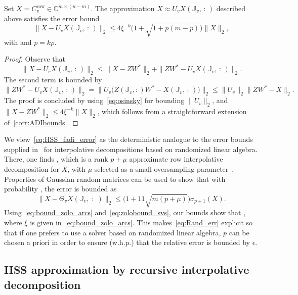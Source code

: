 \documentclass[final,reqno,onefignum,onetabnum]{siamart190516}
\newcommand{\C}{\mathbb{C}}
\begin{document}
\begin{lemma} 
\label{lemma:int_decomp_error_leaf}
Set $X = C_v^{\mathrm{row}} \in \C^{m \times (n-m)}$.
The approximation $X \approx U_v X(\mathbb{J}_v, \, : \,)$ described above satisfies the error bound
\begin{equation} 
\label{eq:HSS_fadi_error}
\|X - U_v X(\mathbb{J}_v, \, : \,)\|_2 \leq 4 \xi^{-k} \big( 1 + \sqrt{1+p(m-p)}\big) \|X\|_2,
\end{equation}
with  and $p = k \rho$.
\end{lemma}
\begin{proof}
Observe that
$$ \|X - U_v X(\mathbb{J}_v, \, : \,)\|_2 \leq  \|X - ZW^*\|_2 + \|ZW^* - U_v X(\mathbb{J}_v, \, : \,)\|_2.$$
The second term is bounded by
\[
 \|ZW^* - U_v X(\mathbb{J}_v, \, : \,)\|_2
 = \big\|
 U_v \big(
 Z(\mathbb J_v,:) W^* - X(\mathbb{J}_v, \, : \,)
 \big) 
 \big\|_2 \le \|U_v\|_2\|  ZW^* - X  \|_2.
\]
The proof is concluded by using~\eqref{eq:osinsky} for bounding $\|U_v\|_2$, and $\|X - ZW^*\|_2 \leq 4 \xi^{-k} \|X\|_2$,
which follows from a straightforward extension of~\cref{corr:ADIbounds}.
\end{proof}


We view~\eqref{eq:HSS_fadi_error} as the deterministic analogue to the error bounds supplied in~\cite[Eq.~3.6]{xia2012superfast} for interpolative decompositions based on randomized linear algebra. There, one finds  , which is a rank $p + \mu$ approximate row interpolative decomposition for $X$, with $\mu$ selected as a small  oversampling parameter~\cite{halko2011finding}. Properties of Gaussian random matrices can be used to show that with probability , the error is bounded as~\cite[Eq.~(3.6)]{xia2012superfast} 
\begin{equation} 
\label{eq:Rand_err}
\|X - \Theta_v X(\mathbb J_v, \; : \;)\|_2 \leq \big( 1 + 11 \sqrt{m(p + \mu)}\big) \sigma_{p+1}(X). 
\end{equation}
Using~\eqref{eq:bound_zolo_arcs} and~\eqref{eq:zolobound_svs}, our bounds show that , where $\xi$ is given in~\eqref{eq:bound_zolo_arcs}. This makes~\eqref{eq:Rand_err} explicit so that if one prefers to use a solver based on randomized linear algebra, $p$ can be chosen a priori in order to ensure (w.h.p.) that the relative error is bounded by $\epsilon$. 


\subsection{HSS approximation by recursive interpolative decomposition}
\label{sec:merge}
\end{document}
